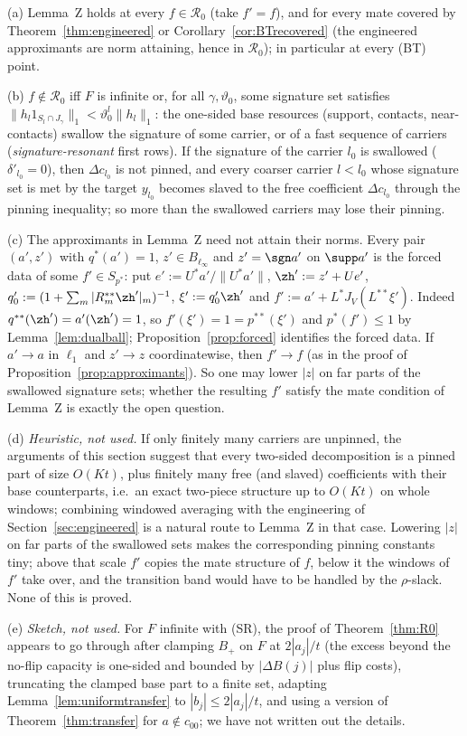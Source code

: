 \begin{remark}\label{rem:lemmaZ}
(a) Lemma~Z holds at every $f\in\mathcal R_0$ (take $f'=f$), and for every
mate covered by Theorem~\ref{thm:engineered} or
Corollary~\ref{cor:BTrecovered} (the engineered approximants are norm
attaining, hence in $\mathcal R_0$); in particular at every \textup{(BT)}
point.

(b) $f\notin\mathcal R_0$ iff $F$ is infinite or, for all $\gamma,\vartheta_0$,
some signature set satisfies $\|h_l1_{S_l\cap J_\gamma}\|_1<\vartheta_0^l
\|h_l\|_1$: the one-sided base resources (support, contacts,
near-contacts) swallow the signature of some carrier, or of a fast sequence
of carriers (\emph{signature-resonant} first rows).  If the signature of the
carrier $l_0$ is swallowed ($\delta'_{l_0}=0$), then $\Delta c_{l_0}$ is not
pinned, and every coarser carrier $l<l_0$ whose signature set is met by the
target $y_{l_0}$ becomes slaved to the free coefficient $\Delta c_{l_0}$
through the pinning inequality; so more than the swallowed carriers may
lose their pinning.

(c) The approximants in Lemma~Z need not attain their norms.  Every pair
$(a',z')$ with $q^*(a')=1$, $z'\in B_{\ell_\infty}$ and $z'=\sgn a'$ on
$\supp a'$ is the forced data of some $f'\in S_{p^*}$: put
$e':=U^*a'/\|U^*a'\|$, $\zh':=z'+Ue'$, $q'_0:=(1+\sum_m|R^{**}_m\zh'|_m)^{-1}$,
$\xi':=q_0'\zh'$ and $f':=a'+L^*J_V(L^{**}\xi')$.  Indeed $q^{**}(\zh')=
a'(\zh')=1$, so $f'(\xi')=1=p^{**}(\xi')$ and $p^*(f')\le1$ by
Lemma~\ref{lem:dualball}; Proposition~\ref{prop:forced} identifies the
forced data.  If $a'\to a$ in $\ell_1$ and $z'\to z$ coordinatewise, then
$f'\to f$ (as in the proof of Proposition~\ref{prop:approximants}).  So one
may lower $|z|$ on far parts of the swallowed signature sets; whether the
resulting $f'$ satisfy the mate condition of Lemma~Z is exactly the open
question.

(d) \emph{Heuristic, not used.}  If only finitely many carriers are unpinned,
the arguments of this section suggest that every two-sided decomposition is a
pinned part of size $O(Kt)$, plus finitely many free (and slaved)
coefficients with their base counterparts, i.e.\ an exact two-piece
structure up to $O(Kt)$ on whole windows; combining windowed averaging with
the engineering of Section~\ref{sec:engineered} is a natural route to
Lemma~Z in that case.  Lowering $|z|$ on far parts of the swallowed sets
makes the corresponding pinning constants tiny; above that scale $f'$
copies the mate structure of $f$, below it the windows of $f'$ take over,
and the transition band would have to be handled by the $\rho$-slack.
None of this is proved.

(e) \emph{Sketch, not used.}  For $F$ infinite with (SR), the proof of
Theorem~\ref{thm:R0} appears to go through after clamping $B_+$ on $F$ at
$2|a_j|/t$ (the excess beyond the no-flip capacity is one-sided and bounded
by $|\Delta B(j)|$ plus flip costs), truncating the clamped base part to a
finite set, adapting Lemma~\ref{lem:uniformtransfer} to $|b_j|\le2|a_j|/t$,
and using a version of Theorem~\ref{thm:transfer} for $a\notin c_{00}$; we
have not written out the details.
\end{remark}
